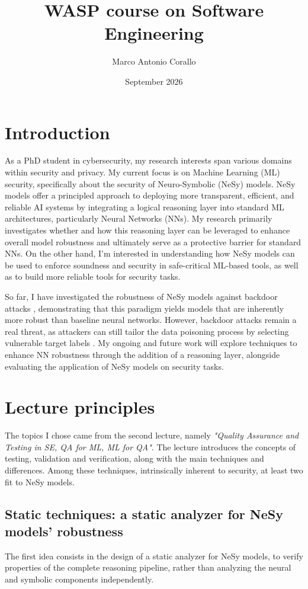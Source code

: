 \documentclass[11pt]{article}
\title{WASP course on Software Engineering}
\author{Marco Antonio Corallo}
\date{September 2026}
\begin{document}
\maketitle

\section{Introduction}
As a PhD student in cybersecurity, my research interests span various domains within security and privacy. My current focus is on Machine Learning (ML) security, specifically about the security of Neuro-Symbolic (NeSy) models. NeSy models offer a principled approach to deploying more transparent, efficient, and reliable AI systems \cite{Ciatto_2024,marra2024statisticalrelationalneurosymbolicartificial} by integrating a logical reasoning layer into standard ML architectures, particularly Neural Networks (NNs). My research primarily investigates whether and how this reasoning layer can be leveraged to enhance overall model robustness and ultimately serve as a protective barrier for standard NNs. On the other hand, I'm interested in understanding how NeSy models can be used to enforce soundness and security in safe-critical ML-based tools, as well as to build more reliable tools for security tasks.

So far, I have investigated the robustness of NeSy models against backdoor attacks \cite{guo2021overviewbackdoorattacksdeep}, demonstrating that this paradigm yields models that are inherently more robust than baseline neural networks. However, backdoor attacks remain a real threat, as attackers can still tailor the data poisoning process by selecting vulnerable target labels \cite{corallo2026doesreasoningmitigatebackdoor}. My ongoing and future work will explore techniques to enhance NN robustness through the addition of a reasoning layer, alongside evaluating the application of NeSy models on security tasks.

\section{Lecture principles}
The topics I chose came from the second lecture, namely \textit{"Quality Assurance and Testing in SE, QA for ML, ML for QA"}. 
The lecture introduces the concepts of testing, validation and verification, along with the main techniques and differences. 
Among these techniques, intrinsically inherent to security, at least two fit to NeSy models.

\subsection{Static techniques: a static analyzer for NeSy models' robustness}
The first idea consists in the design of a static analyzer for NeSy models, to verify properties of the complete reasoning pipeline, rather than analyzing the neural and symbolic components independently.
\end{document}
